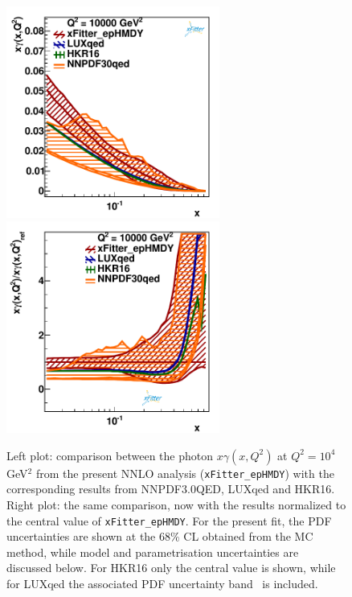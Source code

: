 \begin{figure}[t]
  \includegraphics[width=7cm]{figs/photon_comp_10000.pdf}
  \includegraphics[width=7cm]{figs/photon_comp_10000_ratio.pdf} 
  \caption{Left plot: comparison between the photon $x\gamma(x,Q^2)$ at $Q^2=10^4$ GeV$^2$
    from the present NNLO analysis ({\tt xFitter\_epHMDY}) with the
    corresponding results from NNPDF3.0QED, LUXqed and HKR16.
  Right plot: the same comparison, now with the results normalized to the central value
  of {\tt xFitter\_epHMDY}.
  For the present fit, the PDF uncertainties are shown at the 68\% CL obtained from the MC method,
  while model and parametrisation uncertainties are discussed below.
  For HKR16 only the central value is shown, while for LUXqed
  the associated PDF uncertainty band~\cite{Manohar:2016nzj} is included. }
\label{photon_zoom} \label{photon_zoom_ratio}
\end{figure}

